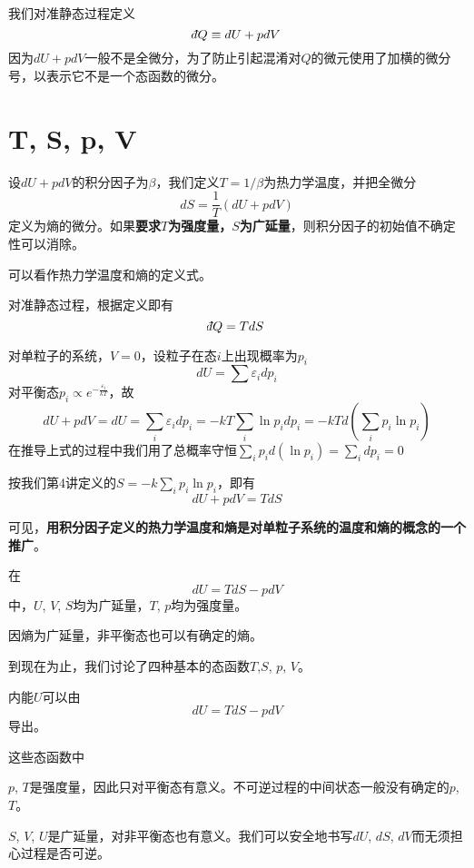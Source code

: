 \documentclass[CJK]{beamer}
\begin{document}
\begin{frame}
\bch
我们对准静态过程定义
$$\dbar Q \equiv dU + pdV$$
因为$dU + pdV$一般不是全微分，为了防止引起混淆对$Q$的微元使用了加横的微分号，以表示它不是一个态函数的微分。
\ech
\end{frame}

\section{T, S, p, V}

\begin{frame}
\bch
设$dU + pdV$的积分因子为$\beta$，我们定义$T=1/\beta$为热力学温度，并把全微分
$$ dS = \frac{1}{T} \left(dU + p dV \right)$$
定义为熵的微分。如果{\bf 要求$T$为强度量，$S$为广延量}，则积分因子的初始值不确定性可以消除。

可以看作热力学温度和熵的定义式。

对准静态过程，根据定义即有
$$\dbar Q = TdS$$

\ech
\end{frame}


\begin{frame}
\bch
{\small
对单粒子的系统，$V=0$，设粒子在态$i$上出现概率为$p_i$
$$dU = \sum  \varepsilon_i dp_i $$
对平衡态$p_i \propto e^{-\frac{\varepsilon_i}{kT}}$，故
$$dU + pdV = dU =  \sum_i \varepsilon_i d p_i = -kT \sum_i \ln p_i d p_i = -kT d(\sum_i p_i \ln p_i)$$
在推导上式的过程中我们用了总概率守恒$\sum_i p_i d(\ln p_i) = \sum_i d p_i = 0$

按我们第4讲定义的$ S = -k \sum_i p_i \ln p_i$，即有
$$dU+pdV = T dS$$

可见，{\bf 用积分因子定义的热力学温度和熵是对单粒子系统的温度和熵的概念的一个推广}。
}
\ech
\end{frame}


\begin{frame}
\bch
在
$$ dU =  T dS - pdV$$
中，$U$, $V$, $S$均为广延量，$T$, $p$均为强度量。

\skiplines

因熵为广延量，非平衡态也可以有确定的熵。
\ech
\end{frame}


\begin{frame}
\bch
到现在为止，我们讨论了四种基本的态函数$T$,$S$, $p$, $V$。

内能$U$可以由
$$ dU = T dS -  p dV$$
导出。

这些态函数中
\bitem
\item{$p$, $T$是强度量，因此只对平衡态有意义。不可逆过程的中间状态一般没有确定的$p$, $T$。}
\item{$S$, $V$, $U$是广延量，对非平衡态也有意义。我们可以安全地书写$dU$, $dS$, $dV$而无须担心过程是否可逆。}
\eitem

\ech
\end{frame}
\end{document}
